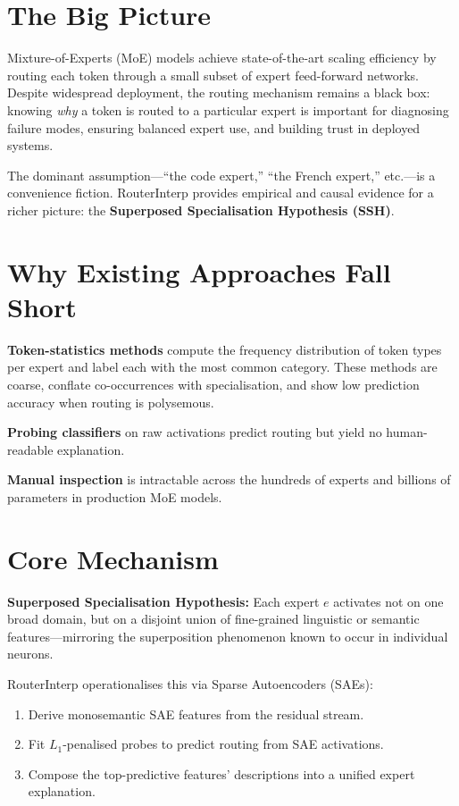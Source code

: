 \documentclass[10pt,twocolumn]{article}
\begin{document}
\section{The Big Picture}

Mixture-of-Experts (MoE) models achieve state-of-the-art scaling
efficiency by routing each token through a small subset of expert
feed-forward networks. Despite widespread deployment, the routing
mechanism remains a black box: knowing \emph{why} a token is routed to
a particular expert is important for diagnosing failure modes, ensuring
balanced expert use, and building trust in deployed systems.

The dominant assumption---``the code expert,'' ``the French expert,'' etc.---is
a convenience fiction. RouterInterp provides empirical and causal evidence
for a richer picture: the \textbf{Superposed Specialisation Hypothesis (SSH)}.

\section{Why Existing Approaches Fall Short}

\textbf{Token-statistics methods} compute the frequency distribution of
token types per expert and label each with the most common category.
These methods are coarse, conflate co-occurrences with specialisation,
and show low prediction accuracy when routing is polysemous.

\textbf{Probing classifiers} on raw activations predict routing but
yield no human-readable explanation.

\textbf{Manual inspection} is intractable across the hundreds of experts
and billions of parameters in production MoE models.

\section{Core Mechanism}

\textbf{Superposed Specialisation Hypothesis:} Each expert $e$ activates
not on one broad domain, but on a disjoint union of fine-grained
linguistic or semantic features---mirroring the superposition phenomenon
known to occur in individual neurons.

RouterInterp operationalises this via Sparse Autoencoders (SAEs):
\begin{enumerate}[itemsep=2pt,parsep=0pt]
  \item Derive monosemantic SAE features from the residual stream.
  \item Fit $L_1$-penalised probes to predict routing from SAE activations.
  \item Compose the top-predictive features' descriptions into a
    unified expert explanation.
\end{enumerate}
\end{document}
